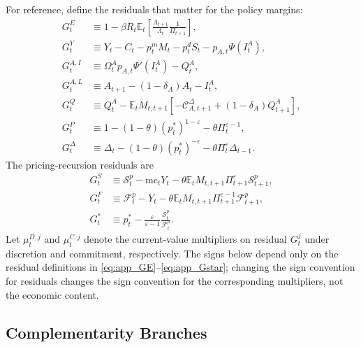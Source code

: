 ﻿\documentclass[12pt]{article}
\theoremstyle{remark}
\newcommand{\E}{\mathbb E}
\newcommand{\mc}{\mathrm{mc}}
\newcommand{\C}{\mathcal C}
\begin{document}
For reference, define the residuals that matter for the policy margins:
\begin{align}
    G_t^E
    &\equiv
    1-\beta R_t
    \E_t
    \left[
        \frac{\Lambda_{t+1}}{\Lambda_t}
        \frac{1}{\Pi_{t+1}}
    \right],
    \label{eq:app_GE}\\
    G_t^Y
    &\equiv
    Y_t-C_t-p_t^mM_t-p_t^dS_t-p_{A,t}\Psi(I_t^A),
    \label{eq:app_GY}\\
    G_t^{A,I}
    &\equiv
    \Omega_t^Ap_{A,t}\Psi'(I_t^A)-Q_t^A,
    \label{eq:app_GAI}\\
    G_t^{A,L}
    &\equiv
    A_{t+1}-(1-\delta_A)A_t-I_t^A,
    \label{eq:app_GAL}\\
    G_t^Q
    &\equiv
    Q_t^A
    -
    \E_tM_{t,t+1}
    \left[
        -\C_{A,t+1}^{\Delta}
        +(1-\delta_A)Q_{t+1}^A
    \right],
    \label{eq:app_GQ}\\
    G_t^P
    &\equiv
    1-(1-\theta)(p_t^*)^{1-\varepsilon}
    -\theta\Pi_t^{\varepsilon-1},
    \label{eq:app_GP}\\
    G_t^\Delta
    &\equiv
    \Delta_t-(1-\theta)(p_t^*)^{-\varepsilon}
    -\theta\Pi_t^{\varepsilon}\Delta_{t-1}.
    \label{eq:app_GDelta}
\end{align}
The pricing-recursion residuals are
\begin{align}
    G_t^S
    &\equiv
    \mathcal S_t^p
    -
    \mc_tY_t
    -
    \theta\E_tM_{t,t+1}\Pi_{t+1}^{\varepsilon}\mathcal S_{t+1}^p,
    \label{eq:app_GS}\\
    G_t^F
    &\equiv
    \mathcal F_t^p
    -
    Y_t
    -
    \theta\E_tM_{t,t+1}\Pi_{t+1}^{\varepsilon-1}\mathcal F_{t+1}^p,
    \label{eq:app_GF}\\
    G_t^*
    &\equiv
    p_t^*
    -
    \frac{\varepsilon}{\varepsilon-1}
    \frac{\mathcal S_t^p}{\mathcal F_t^p}.
    \label{eq:app_Gstar}
\end{align}
Let $\mu_t^{D,j}$ and $\mu_t^{C,j}$ denote the current-value multipliers on residual $G_t^j$ under
discretion and commitment, respectively. The signs below depend only on the residual definitions
in \eqref{eq:app_GE}--\eqref{eq:app_Gstar}; changing the sign convention for residuals changes the
sign convention for the corresponding multipliers, not the economic content.

\subsection{Complementarity Branches}
\end{document}
